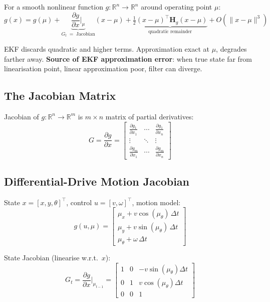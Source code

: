 \documentclass[11pt,a4paper]{article}
\begin{document}
For a smooth nonlinear function $g: \mathbb{R}^n \to \mathbb{R}^n$ around operating point $\mu$:
\[
g(x) = g(\mu) + \underbrace{\frac{\partial g}{\partial x}\bigg|_{\mu}}_{G_t \;=\; \text{Jacobian}}(x - \mu) + \underbrace{\tfrac{1}{2}(x-\mu)^\top \mathbf{H}_g(x-\mu)}_{\text{quadratic remainder}} + O(\|x-\mu\|^3)
\]

EKF discards quadratic and higher terms. Approximation exact at $\mu$, degrades farther away. \textbf{Source of EKF approximation error}: when true state far from linearisation point, linear approximation poor, filter can diverge.

\subsection{The Jacobian Matrix}

Jacobian of $g: \mathbb{R}^n \to \mathbb{R}^m$ is $m \times n$ matrix of partial derivatives:
\[
G = \frac{\partial g}{\partial x} = \begin{bmatrix}\frac{\partial g_1}{\partial x_1} & \cdots & \frac{\partial g_1}{\partial x_n} \\ \vdots & \ddots & \vdots \\ \frac{\partial g_m}{\partial x_1} & \cdots & \frac{\partial g_m}{\partial x_n}\end{bmatrix}
\]

\subsection{Differential-Drive Motion Jacobian}

State $x = [x, y, \theta]^\top$, control $u = [v, \omega]^\top$, motion model:
\[
g(u, \mu) = \begin{bmatrix}\mu_x + v\cos(\mu_\theta)\, \Delta t \\ \mu_y + v\sin(\mu_\theta)\, \Delta t \\ \mu_\theta + \omega\, \Delta t\end{bmatrix}
\]

State Jacobian (linearise w.r.t.\ $x$):
\begin{equation}
G_t = \frac{\partial g}{\partial x}\bigg|_{\mu_{t-1}} = \begin{bmatrix}1 & 0 & -v\sin(\mu_\theta)\Delta t \\ 0 & 1 & v\cos(\mu_\theta)\Delta t \\ 0 & 0 & 1\end{bmatrix}
\end{equation}
\end{document}
